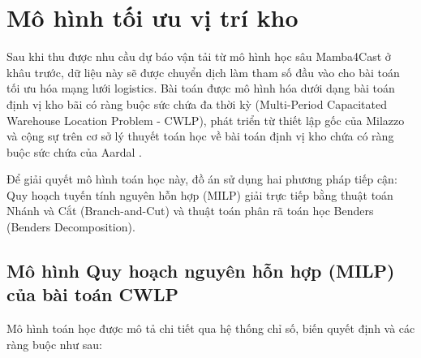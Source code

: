 \section{Mô hình tối ưu vị trí kho}
\label{sec:warehouse_optimization_model}

Sau khi thu được nhu cầu dự báo vận tải từ mô hình học sâu Mamba4Cast ở khâu trước, dữ liệu này sẽ được chuyển dịch làm tham số đầu vào cho bài toán tối ưu hóa mạng lưới logistics. Bài toán được mô hình hóa dưới dạng bài toán định vị kho bãi có ràng buộc sức chứa đa thời kỳ (Multi-Period Capacitated Warehouse Location Problem - CWLP), phát triển từ thiết lập gốc của Milazzo và cộng sự \cite{milazzo2022} trên cơ sở lý thuyết toán học về bài toán định vị kho chứa có ràng buộc sức chứa của Aardal \cite{aardal1998}. 

Để giải quyết mô hình toán học này, đồ án sử dụng hai phương pháp tiếp cận: Quy hoạch tuyến tính nguyên hỗn hợp (MILP) giải trực tiếp bằng thuật toán Nhánh và Cắt (Branch-and-Cut) và thuật toán phân rã toán học Benders (Benders Decomposition).

\subsection{Mô hình Quy hoạch nguyên hỗn hợp (MILP) của bài toán CWLP}

Mô hình toán học được mô tả chi tiết qua hệ thống chỉ số, biến quyết định và các ràng buộc như sau:

